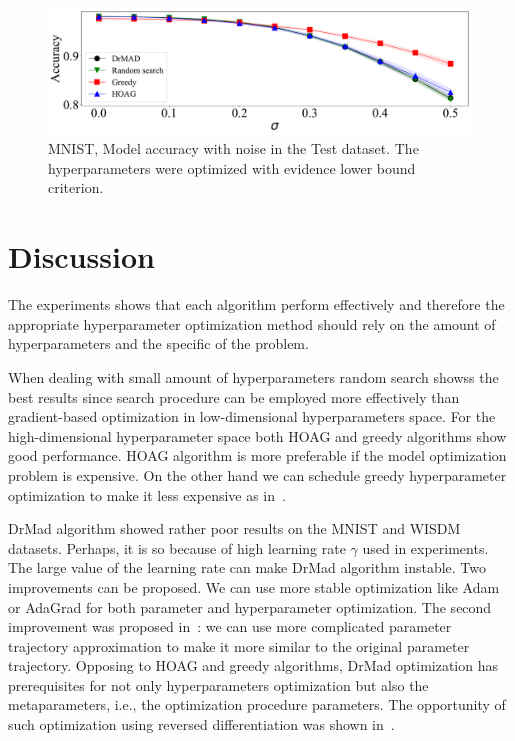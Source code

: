 \documentclass[smallcondensed]{svjour3}
\begin{document}
    \begin{figure}

    \includegraphics[width=\linewidth]{plots/Fig_noise2.pdf}

    \caption{MNIST, Model accuracy with noise in the Test dataset. The hyperparameters were optimized with evidence lower bound criterion.}
    \label{fig:noise}
    \end{figure}





\section{Discussion}
\label{discussion}
The experiments shows that each algorithm perform effectively and therefore the appropriate hyperparameter optimization method should rely on the amount of hyperparameters and the specific of the problem. 

When dealing with small amount of hyperparameters random search showss the best results since search procedure can be employed more effectively than gradient-based optimization in low-dimensional hyperparameters space. For the high-dimensional hyperparameter space both  HOAG and greedy algorithms show good performance. 
HOAG algorithm is more preferable if the model optimization problem is expensive. On the other hand we can schedule greedy hyperparameter optimization to make it less expensive as in~\cite{hyper_greed}. 

DrMad algorithm showed rather poor results on the MNIST and WISDM datasets. Perhaps, it is so because of high learning rate $\gamma$ used in experiments. The large value of the learning rate can make DrMad algorithm instable. Two improvements can be proposed. We can use more stable optimization like Adam or AdaGrad for both parameter and hyperparameter optimization. The second improvement was proposed in~\cite{hyper_mad}: we can use more complicated parameter trajectory approximation to make it more similar to the original parameter trajectory. Opposing to HOAG and greedy algorithms, DrMad optimization has prerequisites for not only hyperparameters optimization but also the metaparameters, i.e., the optimization procedure parameters. The opportunity of such optimization using reversed differentiation was shown in~\cite{hyper_mad}. 
\end{document}
